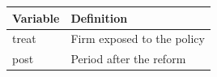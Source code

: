 \begin{tabular}{ll}
\toprule
Variable & Definition \\
\midrule
treat & Firm exposed to the policy \\
post  & Period after the reform \\
\bottomrule
\end{tabular}
